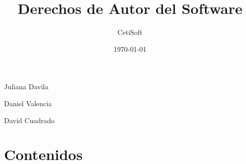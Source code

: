 \documentclass[8pt,a4paper,spanish]{beamer}
\title{Derechos de Autor del Software}
\author{CetiSoft}
\date{\today}
\begin{document}
\frame
{
	\titlepage
	\begin{center}
	\item Juliana Davila
	\item Daniel Valencia
	\item David Cuadrado
	\end{center}
}

\section{Contenidos}
\frame
{
\tableofcontents
}












\end{document}
